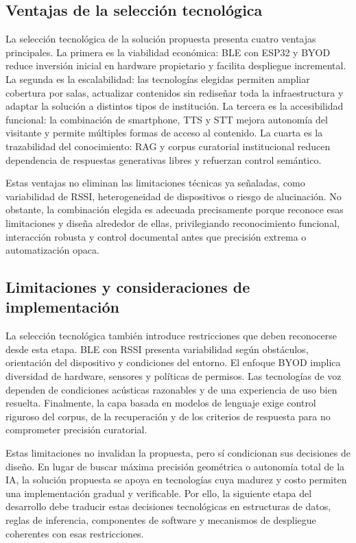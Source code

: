 \subsection{Ventajas de la selección tecnológica}

La selección tecnológica de la solución propuesta presenta cuatro ventajas principales. La primera es la viabilidad económica: BLE con ESP32 y BYOD reduce inversión inicial en hardware propietario y facilita despliegue incremental. La segunda es la escalabilidad: las tecnologías elegidas permiten ampliar cobertura por salas, actualizar contenidos sin rediseñar toda la infraestructura y adaptar la solución a distintos tipos de institución. La tercera es la accesibilidad funcional: la combinación de smartphone, TTS y STT mejora autonomía del visitante y permite múltiples formas de acceso al contenido. La cuarta es la trazabilidad del conocimiento: RAG y corpus curatorial institucional reducen dependencia de respuestas generativas libres y refuerzan control semántico.

Estas ventajas no eliminan las limitaciones técnicas ya señaladas, como variabilidad de RSSI, heterogeneidad de dispositivos o riesgo de alucinación. No obstante, la combinación elegida es adecuada precisamente porque reconoce esas limitaciones y diseña alrededor de ellas, privilegiando reconocimiento funcional, interacción robusta y control documental antes que precisión extrema o automatización opaca.

\subsection{Limitaciones y consideraciones de implementación}

La selección tecnológica también introduce restricciones que deben reconocerse desde esta etapa. BLE con RSSI presenta variabilidad según obstáculos, orientación del dispositivo y condiciones del entorno. El enfoque BYOD implica diversidad de hardware, sensores y políticas de permisos. Las tecnologías de voz dependen de condiciones acústicas razonables y de una experiencia de uso bien resuelta. Finalmente, la capa basada en modelos de lenguaje exige control riguroso del corpus, de la recuperación y de los criterios de respuesta para no comprometer precisión curatorial.

Estas limitaciones no invalidan la propuesta, pero sí condicionan sus decisiones de diseño. En lugar de buscar máxima precisión geométrica o autonomía total de la IA, la solución propuesta se apoya en tecnologías cuya madurez y costo permiten una implementación gradual y verificable. Por ello, la siguiente etapa del desarrollo debe traducir estas decisiones tecnológicas en estructuras de datos, reglas de inferencia, componentes de software y mecanismos de despliegue coherentes con esas restricciones.

